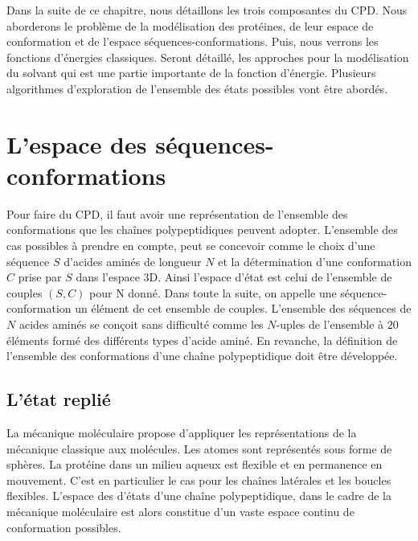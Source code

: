 Dans la suite de ce chapitre, nous détaillons les trois composantes du CPD. Nous aborderons le problème de la modélisation des protéines, de leur espace de conformation et de l'espace séquences-conformations. Puis, nous verrons les fonctions d'énergies classiques. Seront détaillé, les approches pour la modélisation du solvant qui est une partie importante de la fonction d'énergie. Plusieurs algorithmes d'exploration de l'ensemble des états possibles vont être abordés.  

\section{L'espace des séquences-conformations}
Pour faire du CPD, il faut avoir une représentation de l'ensemble des conformations que les chaînes polypeptidiques peuvent adopter. L'ensemble des cas possibles à prendre en compte, peut se concevoir comme le choix d'une séquence $S$ d'acides aminés de longueur $N$ et la détermination d'une conformation $C$ prise par $S$ dans l'espace 3D. Ainsi l'espace d'état est celui de l'ensemble de couples $(S,C)$ pour N donné. Dans toute la suite, on appelle une séquence-conformation un élément de cet ensemble de couples. L'ensemble des séquences de $N$ acides aminés se conçoit sans difficulté comme les $N$-uples de l'ensemble à $20$ éléments formé des différents types d'acide aminé. En revanche, la définition de l'ensemble des conformations d'une chaîne polypeptidique doit être développée.

\subsection{L'état replié }
La mécanique moléculaire propose d'appliquer les représentations de la mécanique classique aux molécules. Les atomes sont représentés sous forme de sphères. La protéine dans un milieu aqueux est flexible et en permanence en mouvement. C'est en particulier le cas pour les chaînes latérales et les boucles flexibles. L'espace des d'états d'une chaîne polypeptidique, dans le cadre de la mécanique moléculaire est alors constitue d'un vaste espace continu de conformation possibles.

